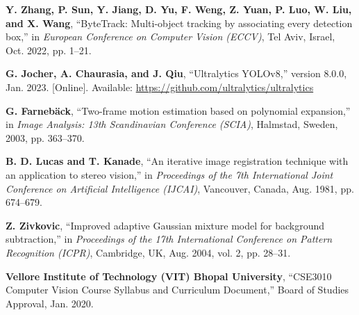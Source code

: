 \begin{enumerate}[label={[\arabic*]}]
    \item \textbf{Y. Zhang, P. Sun, Y. Jiang, D. Yu, F. Weng, Z. Yuan, P. Luo, W. Liu, and X. Wang}, ``ByteTrack: Multi-object tracking by associating every detection box,'' in \textit{European Conference on Computer Vision (ECCV)}, Tel Aviv, Israel, Oct. 2022, pp. 1--21.
    
    \item \textbf{G. Jocher, A. Chaurasia, and J. Qiu}, ``Ultralytics YOLOv8,'' version 8.0.0, Jan. 2023. [Online]. Available: \url{https://github.com/ultralytics/ultralytics}
    
    \item \textbf{G. Farneb{\"a}ck}, ``Two-frame motion estimation based on polynomial expansion,'' in \textit{Image Analysis: 13th Scandinavian Conference (SCIA)}, Halmstad, Sweden, 2003, pp. 363--370.
    
    \item \textbf{B. D. Lucas and T. Kanade}, ``An iterative image registration technique with an application to stereo vision,'' in \textit{Proceedings of the 7th International Joint Conference on Artificial Intelligence (IJCAI)}, Vancouver, Canada, Aug. 1981, pp. 674--679.
    
    \item \textbf{Z. Zivkovic}, ``Improved adaptive Gaussian mixture model for background subtraction,'' in \textit{Proceedings of the 17th International Conference on Pattern Recognition (ICPR)}, Cambridge, UK, Aug. 2004, vol. 2, pp. 28--31.
    
    \item \textbf{Vellore Institute of Technology (VIT) Bhopal University}, ``CSE3010 Computer Vision Course Syllabus and Curriculum Document,'' Board of Studies Approval, Jan. 2020.
\end{enumerate}

